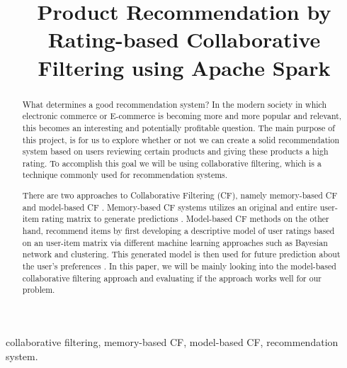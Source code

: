 \documentclass[conference]{IEEEtran}
\begin{document}
\title{Product Recommendation by Rating-based Collaborative Filtering using Apache Spark}

\author{
\and
{}
\and
{}
}

\maketitle

\begin{abstract}

What determines a good recommendation system?  In the modern society in which electronic commerce or E-commerce is becoming more and more popular and relevant, this becomes an interesting and potentially profitable question.  The main purpose of this project, is for us to explore whether or not we can create a solid recommendation system based on users reviewing certain products and giving these products a high rating.  To accomplish this goal we will be using collaborative filtering, which is a technique commonly used for recommendation systems.

There are two approaches to Collaborative Filtering (CF), namely memory-based CF and model-based CF \cite{Breese}. Memory-based CF systems utilizes an original and entire user-item rating matrix to generate predictions \cite{Resnick}. Model-based CF methods on the other hand, recommend items by first developing a descriptive model of user ratings based on an user-item matrix via different machine learning approaches such as Bayesian network and clustering. This generated model is then used for future prediction about the user's preferences \cite{Breese}. In this paper, we will be mainly looking into the model-based collaborative filtering approach and evaluating if the approach works well for our problem. 

\end{abstract}

\begin{IEEEkeywords}
collaborative filtering, memory-based CF, model-based CF, recommendation system. 
\end{IEEEkeywords}
\end{document}
